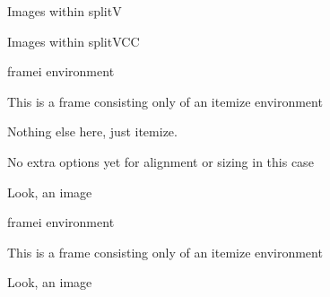 \documentclass[11pt,compress,t,notes=noshow, xcolor=table]{beamer}
\begin{document}

\begin{frame}{Images within splitV}
  
  
  \vfill
  
  
\end{frame}


\begin{frame}{Images within splitVCC}
  
  
  \vfill
  
  
\end{frame}


\begin{framei}{framei environment}
  \item This is a frame consisting only of an itemize environment
  \item Nothing else here, just itemize.
  \item No extra options yet for alignment or sizing in this case
  \item Look, an image
\end{framei}

\begin{framei}{framei environment}
  \item This is a frame consisting only of an itemize environment
  
  
  \item Look, an image
\end{framei}
\end{document}
